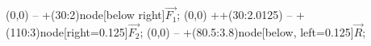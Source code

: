 \documentclass{standalone}
\begin{document}
\begin{myTikz}[]{4.25}
	 (0,0) -- +(30:2)node[below right]{$\vec{F_1}$};
	 (0,0) ++(30:2.0125) -- +(110:3)node[right=0.125]{$\vec{F_2}$};
	 (0,0) -- +(80.5:3.8)node[below, left=0.125]{$\vec{R}$};
\end{myTikz}
\end{document}
